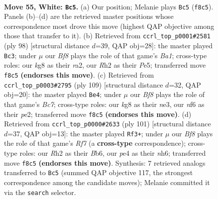 \documentclass[11pt]{article}
\begin{document}
\clearpage

\begin{figure}[p]\centering
\begin{subfigure}{0.46\textwidth}\centering
\resizebox{\linewidth}{!}{%
\newchessgame
\chessboard[
  setfen={5Bk1/5p2/5n2/8/p3pK1p/P6P/3r1P1R/8 w - - 10 55},
  showmover=false,
  pgfstyle=straightmove, color=movearrow, markmove={f8-c5}
]}
\caption{}
\end{subfigure}\hfill
\begin{subfigure}{0.46\textwidth}\centering
\resizebox{\linewidth}{!}{%
\newchessgame
\chessboard[
  setfen={3k4/2p5/2n1pR2/2P1P2K/4P2P/8/r7/B7 w - - 5 50},
  showmover=false,
  pgfstyle=straightmove, color=movearrow, markmove={a1-c3}
]}
\caption{}
\end{subfigure}
\\[4pt]
\begin{subfigure}{0.46\textwidth}\centering
\resizebox{\linewidth}{!}{%
\newchessgame
\chessboard[
  setfen={8/1p6/5pk1/8/2P2PP1/R3N3/p1b1PK2/r7 b - - 6 55},
  showmover=false,
  pgfstyle=straightmove, color=movearrow, markmove={c2-e4}
]}
\caption{}
\end{subfigure}\hfill
\begin{subfigure}{0.46\textwidth}\centering
\resizebox{\linewidth}{!}{%
\newchessgame
\chessboard[
  setfen={1R6/1p3p2/pb3k1N/6pP/P5P1/3K4/5r2/8 b - - 13 51},
  showmover=false,
  pgfstyle=straightmove, color=movearrow, markmove={f2-f3}
]}
\caption{}
\end{subfigure}
\caption{\textbf{Move 55, White: \texttt{Bc5}.} (a) Our position; Melanie plays \texttt{Bc5} (\texttt{f8c5}). Panels (b)--(d) are the retrieved master positions whose correspondence most drove this move (highest QAP objective among those that transfer to it). (b) Retrieved from \texttt{ccrl\_top\_p0001\#2581} (ply 98) [structural distance $d$=39, QAP obj=28]: the master played \texttt{Bc3}; under $\mu$ our \emph{Bf8} plays the role of that game's \emph{Ba1}; cross-type roles: our \emph{k}g8 as their \emph{r}a2, our \emph{R}h2 as their \emph{P}e5; transferred move \texttt{f8c5} \textbf{(endorses this move)}. (c) Retrieved from \texttt{ccrl\_top\_p0003\#2795} (ply 109) [structural distance $d$=32, QAP obj=20]: the master played \texttt{Be4}; under $\mu$ our \emph{Bf8} plays the role of that game's \emph{Bc7}; cross-type roles: our \emph{k}g8 as their \emph{n}e3, our \emph{n}f6 as their \emph{p}e2; transferred move \texttt{f8c5} \textbf{(endorses this move)}. (d) Retrieved from \texttt{ccrl\_top\_p0000\#2633} (ply 101) [structural distance $d$=37, QAP obj=13]: the master played \texttt{Rf3+}; under $\mu$ our \emph{Bf8} plays the role of that game's \emph{Rf7} (a \textbf{cross-type} correspondence); cross-type roles: our \emph{R}h2 as their \emph{B}b6, our \emph{p}e4 as their \emph{n}h6; transferred move \texttt{f8c5} \textbf{(endorses this move)}. Synthesis: 7 retrieved analogs transferred to \texttt{Bc5} (summed QAP objective 117, the strongest correspondence among the candidate moves); Melanie committed it via the \texttt{search} selector.}
\label{fig:thought-m108}
\end{figure}
\end{document}

